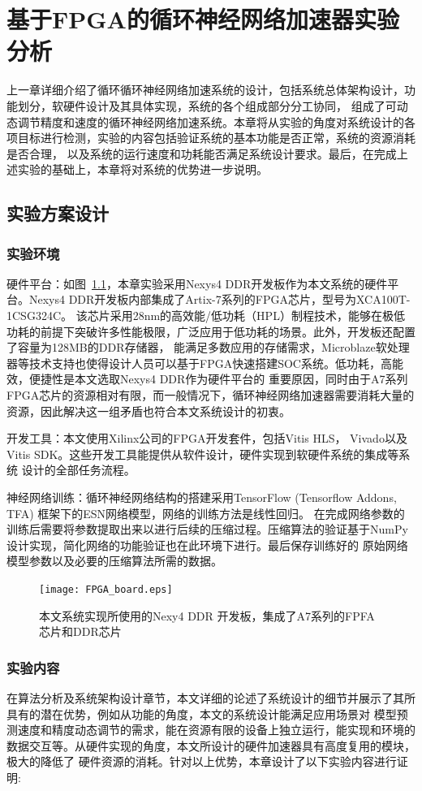 \chapter{基于FPGA的循环神经网络加速器实验分析}
上一章详细介绍了循环循环神经网络加速系统的设计，包括系统总体架构设计，功能划分，软硬件设计及其具体实现，系统的各个组成部分分工协同，
组成了可动态调节精度和速度的循环神经网络加速系统。本章将从实验的角度对系统设计的各项目标进行检测，实验的内容包括验证系统的基本功能是否正常，系统的资源消耗是否合理，
以及系统的运行速度和功耗能否满足系统设计要求。最后，在完成上述实验的基础上，本章将对系统的优势进一步说明。
\section{实验方案设计}
\subsection{实验环境}
硬件平台：如图~\ref{fig_board}，本章实验采用Nexys4 DDR开发板作为本文系统的硬件平台。Nexys4 DDR开发板内部集成了Artix-7系列的FPGA芯片，型号为XCA100T-1CSG324C。
该芯片采用28nm的高效能/低功耗（HPL）制程技术，能够在极低功耗的前提下突破许多性能极限，广泛应用于低功耗的场景。此外，开发板还配置了容量为128MB的DDR存储器，
能满足多数应用的存储需求，Microblaze软处理器等技术支持也使得设计人员可以基于FPGA快速搭建SOC系统。低功耗，高能效，便捷性是本文选取Nexys4 DDR作为硬件平台的
重要原因，同时由于A7系列FPGA芯片的资源相对有限，而一般情况下，循环神经网络加速器需要消耗大量的资源，因此解决这一组矛盾也符合本文系统设计的初衷。

开发工具：本文使用Xilinx公司的FPGA开发套件，包括Vitis HLS， Vivado以及Vitis SDK。这些开发工具能提供从软件设计，硬件实现到软硬件系统的集成等系统
设计的全部任务流程。

神经网络训练：循环神经网络结构的搭建采用TensorFlow (Tensorflow Addons, TFA) 框架下的ESN网络模型，网络的训练方法是线性回归。
在完成网络参数的训练后需要将参数提取出来以进行后续的压缩过程。压缩算法的验证基于NumPy设计实现，简化网络的功能验证也在此环境下进行。最后保存训练好的
原始网络模型参数以及必要的压缩算法所需的数据。
\begin{figure}
	\centering
	\texttt{[image: FPGA\_board.eps]}
	\caption{本文系统实现所使用的Nexy4 DDR 开发板，集成了A7系列的FPFA芯片和DDR芯片}
	\label{fig_board}
\end{figure}
\subsection{实验内容}
在算法分析及系统架构设计章节，本文详细的论述了系统设计的细节并展示了其所具有的潜在优势，例如从功能的角度，本文的系统设计能满足应用场景对
模型预测速度和精度动态调节的需求，能在资源有限的设备上独立运行，能实现和环境的数据交互等。从硬件实现的角度，本文所设计的硬件加速器具有高度复用的模块，极大的降低了
硬件资源的消耗。针对以上优势，本章设计了以下实验内容进行证明:

